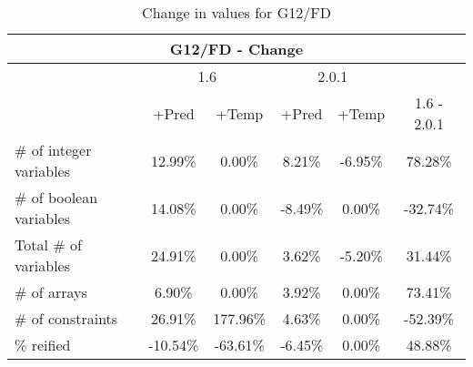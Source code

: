 \documentclass{standalone}
\begin{document}
\begin{table}[H]
\footnotesize
\centering
\begin{tabular}{lc|c|c|c|c}
\multicolumn{6}{c}{G12/FD - Change} \\ 
\hline\hline  & \multicolumn{2}{c|}{1.6} &\multicolumn{2}{c|}{2.0.1} &\\ 
\hline  & +Pred & +Temp & +Pred & +Temp & 1.6 - 2.0.1\\
\# of integer variables & 12.99\% & 0.00\% & 8.21\% & -6.95\% & 78.28\% \\ 
\# of boolean variables & 14.08\% & 0.00\% & -8.49\% & 0.00\% & -32.74\% \\
Total \# of variables   & 24.91\% & 0.00\% & 3.62\% & -5.20\% & 31.44\% \\
\# of arrays            & 6.90\% & 0.00\% & 3.92\% & 0.00\% & 73.41\% \\
\# of constraints       & 26.91\% & 177.96\% & 4.63\% & 0.00\% & -52.39\% \\ 
\% reified               & -10.54\% & -63.61\% & -6.45\% & 0.00\% & 48.88\%\\ 
\end{tabular}\caption{Change in values for G12/FD}
\end{table}
\end{document}
